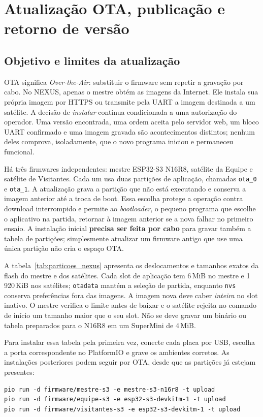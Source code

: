 \chapter{Atualização OTA, publicação e retorno de versão}\label{cap:ota}

\section{Objetivo e limites da atualização}
OTA significa \emph{Over-the-Air}: substituir o firmware sem repetir a gravação por cabo. No NEXUS, apenas o mestre obtém as imagens da Internet. Ele instala sua própria imagem por HTTPS ou transmite pela UART a imagem destinada a um satélite. A decisão de \emph{instalar} continua condicionada a uma autorização do operador. Uma versão encontrada, uma ordem aceita pelo servidor web, um bloco UART confirmado e uma imagem gravada são acontecimentos distintos; nenhum deles comprova, isoladamente, que o novo programa iniciou e permaneceu funcional.

Há três firmwares independentes: mestre ESP32-S3 N16R8, satélite da Equipe e satélite de Visitantes. Cada um usa duas partições de aplicação, chamadas \texttt{ota\_0} e \texttt{ota\_1}. A atualização grava a partição que não está executando e conserva a imagem anterior até a troca de boot. Essa escolha protege a operação contra download interrompido e permite ao \emph{bootloader}, o pequeno programa que escolhe o aplicativo na partida, retornar à imagem anterior se a nova falhar no primeiro ensaio. A instalação inicial \textbf{precisa ser feita por cabo} para gravar também a tabela de partições; simplesmente atualizar um firmware antigo que use uma única partição não cria o espaço OTA.

A tabela~\ref{tab:particoes_nexus} apresenta os deslocamentos e tamanhos exatos da flash do mestre e dos satélites. Cada slot de aplicação tem 6\,MiB no mestre e 1\,920\,KiB nos satélites; \texttt{otadata} mantém a seleção de partida, enquanto \texttt{nvs} conserva preferências fora das imagens. A imagem nova deve caber \emph{inteira} no slot inativo. O mestre verifica o limite antes de baixar e o satélite rejeita no comando de início um tamanho maior que o seu slot. Não se deve gravar um binário ou tabela preparados para o N16R8 em um SuperMini de 4\,MiB.

Para instalar essa tabela pela primeira vez, conecte cada placa por USB, escolha a porta correspondente no PlatformIO e grave os ambientes corretos. As instalações posteriores podem seguir por OTA, desde que as partições já estejam presentes:
\begin{lstlisting}[caption={Primeira gravação com a tabela de partições OTA}]
pio run -d firmware/mestre-s3 -e mestre-s3-n16r8 -t upload
pio run -d firmware/equipe-s3 -e esp32-s3-devkitm-1 -t upload
pio run -d firmware/visitantes-s3 -e esp32-s3-devkitm-1 -t upload
\end{lstlisting}

